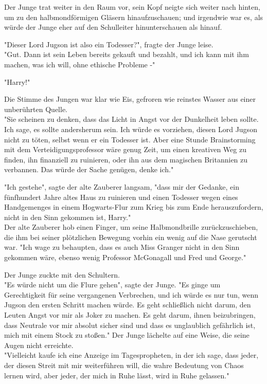 {Der Junge trat weiter in den Raum vor, sein Kopf neigte sich weiter nach hinten, um zu den halbmondförmigen Gläsern hinaufzuschauen; und irgendwie war es, als würde der Junge eher auf den Schulleiter hinunterschauen als hinauf.

"Dieser Lord Jugson ist also ein Todesser?", fragte der Junge leise.\\ "Gut. Dann ist sein Leben bereits gekauft und bezahlt, und ich kann mit ihm machen, was ich will, ohne ethische Probleme -"

"Harry!"

Die Stimme des Jungen war klar wie Eis, gefroren wie reinstes Wasser aus einer unberührten Quelle.\\ "Sie scheinen zu denken, dass das Licht in Angst vor der Dunkelheit leben sollte. Ich sage, es sollte andersherum sein. Ich würde es vorziehen, diesen Lord Jugson nicht zu töten, selbst wenn er ein Todesser ist. Aber eine Stunde Brainstorming mit dem Verteidigungsprofessor wäre genug Zeit, um einen kreativen Weg zu finden, ihn finanziell zu ruinieren, oder ihn aus dem magischen Britannien zu verbannen. Das würde der Sache genügen, denke ich."

"Ich gestehe", sagte der alte Zauberer langsam, "dass mir der Gedanke, ein fünfhundert Jahre altes Haus zu ruinieren und einen Todesser wegen eines Handgemenges in einem Hogwarts-Flur zum Krieg bis zum Ende herauszufordern, nicht in den Sinn gekommen ist, Harry."\\ Der alte Zauberer hob einen Finger, um seine Halbmondbrille zurückzuschieben, die ihm bei seiner plötzlichen Bewegung vorhin ein wenig auf die Nase gerutscht war. "Ich wage zu behaupten, dass es auch Miss Granger nicht in den Sinn gekommen wäre, ebenso wenig Professor McGonagall und Fred und George."

Der Junge zuckte mit den Schultern.\\ "Es würde nicht um die Flure gehen", sagte der Junge. "Es ginge um Gerechtigkeit für seine vergangenen Verbrechen, und ich würde es nur tun, wenn Jugson den ersten Schritt machen würde. Es geht schließlich nicht darum, den Leuten Angst vor mir als Joker zu machen. Es geht darum, ihnen beizubringen, dass Neutrale vor mir absolut sicher sind und dass es unglaublich gefährlich ist, mich mit einem Stock zu stoßen." Der Junge lächelte auf eine Weise, die seine Augen nicht erreichte.\\ "Vielleicht kaufe ich eine Anzeige im Tagespropheten, in der ich sage, dass jeder, der diesen Streit mit mir weiterführen will, die wahre Bedeutung von Chaos lernen wird, aber jeder, der mich in Ruhe lässt, wird in Ruhe gelassen."

}

